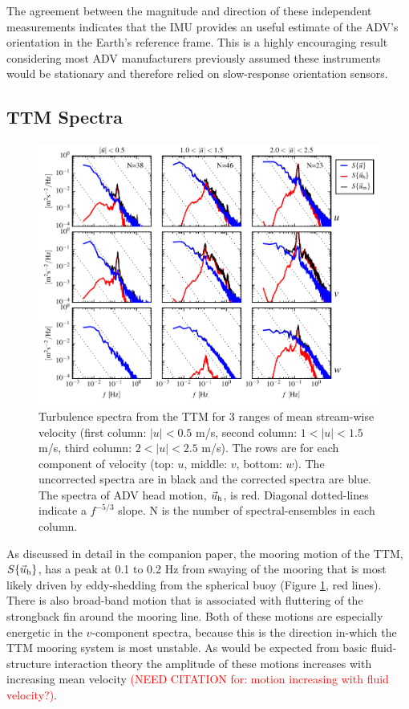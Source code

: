 \documentclass[twocol]{ametsoc}
\newcommand{\citeneeded}[1]{\textcolor{red}{(NEED CITATION for: #1)}}
\begin{document}
The agreement between the magnitude and direction of these independent measurements indicates that the IMU provides an useful estimate of the ADV's orientation in the Earth's reference frame. This is a highly encouraging result considering most ADV manufacturers previously assumed these instruments would be stationary and therefore relied on slow-response orientation sensors.

\subsection{TTM Spectra}

\begin{figure}[t]
  \centering
  \includegraphics{SpecFig02_TTM02B-top}
  \caption{Turbulence spectra from the TTM for 3 ranges of mean stream-wise velocity (first column: $|u|< 0.5$ m/s, second column: $1 < |u| < 1.5$ m/s, third column: $2 < |u| < 2.5$ m/s). The rows are for each component of velocity (top: $u$, middle: $v$, bottom: $w$). The uncorrected spectra are in black and the corrected spectra are blue. The spectra of ADV head motion, $\vec{u}_\mathrm{h}$, is red. Diagonal dotted-lines indicate a $f^{-5/3}$ slope. N is the number of spectral-ensembles in each column.}
  \label{fig:spec01}
\end{figure}

As discussed in detail in the companion paper, the mooring motion of the TTM, $S\{\vec{u}_\mathrm{h}\}$, has a peak at 0.1 to 0.2 Hz from swaying of the mooring that is most likely driven by eddy-shedding from the spherical buoy (Figure \ref{fig:spec01}, red lines). There is also broad-band motion that is associated with fluttering of the strongback fin around the mooring line. Both of these motions are especially energetic in the $v$-component spectra, because this is the direction in-which the TTM mooring system is most unstable. As would be expected from basic fluid-structure interaction theory the amplitude of these motions increases with increasing mean velocity \citeneeded{motion increasing with fluid velocity?}.
\end{document}
